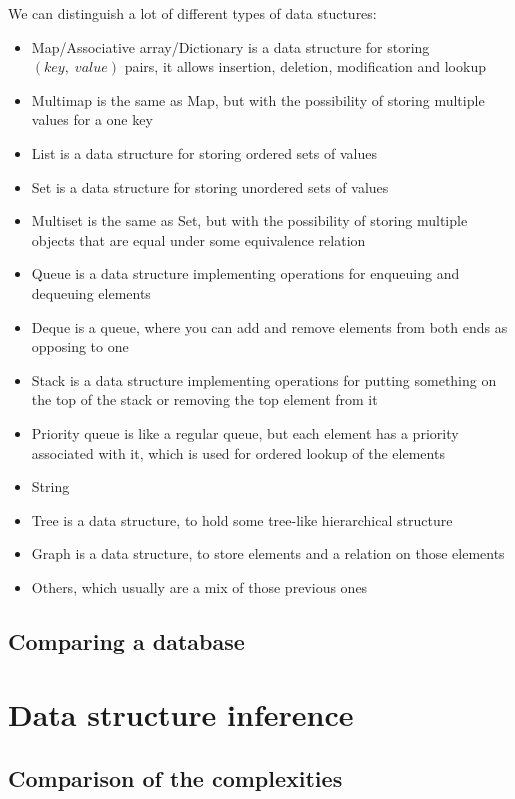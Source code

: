 \documentclass[11pt]{article}
\begin{document}
	We can distinguish a lot of different types of data stuctures:
	\begin{itemize}
		\item Map/Associative array/Dictionary is a data structure for storing $(key,\;value)$ pairs, it allows
			insertion, deletion, modification and lookup
		\item Multimap is the same as Map, but with the possibility of storing multiple values for a one key
		\item List is a data structure for storing ordered sets of values
		\item Set is a data structure for storing unordered sets of values
		\item Multiset is the same as Set, but with the possibility of storing multiple objects that are equal
			under some equivalence relation
		\item Queue is a data structure implementing operations for enqueuing and dequeuing elements
		\item Deque is a queue, where you can add and remove elements from both ends as opposing to one
		\item Stack is a data structure implementing operations for putting something on the top of the stack or
			removing the top element from it
		\item Priority queue is like a regular queue, but each element has a priority associated with it, which
			is used for ordered lookup of the elements
		\item String
		\item Tree is a data structure, to hold some tree-like hierarchical structure
		\item Graph is a data structure, to store elements and a relation on those elements
		\item Others, which usually are a mix of those previous ones
	\end{itemize}

	\subsection{Comparing a database} \label{sub:database}

\section{Data structure inference}

	\subsection{Comparison of the complexities}
\end{document}
